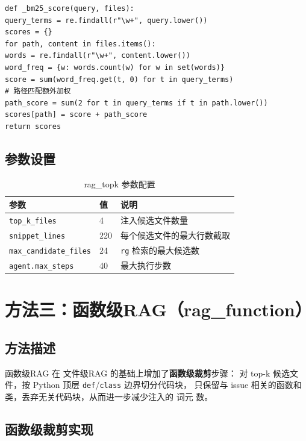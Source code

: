 \begin{lstlisting}[style=promptstyle, caption={TopKFileSelector BM25 打分（节选自 src/compression/context\_compressor.py）}, label={lst:bm25}]
def _bm25_score(query, files):
query_terms = re.findall(r"\w+", query.lower())
scores = {}
for path, content in files.items():
words = re.findall(r"\w+", content.lower())
word_freq = {w: words.count(w) for w in set(words)}
score = sum(word_freq.get(t, 0) for t in query_terms)
# 路径匹配额外加权
path_score = sum(2 for t in query_terms if t in path.lower())
scores[path] = score + path_score
return scores
\end{lstlisting}

\subsection{参数设置}

\begin{table}[htbp]
\centering
\caption{rag\_topk 参数配置}
\label{tab:ragtopk-params}
\begin{tabular}{lll}
\toprule
参数 & 值 & 说明 \\
\midrule
\texttt{top\_k\_files} & 4 & 注入候选文件数量 \\
\texttt{snippet\_lines} & 220 & 每个候选文件的最大行数截取 \\
\texttt{max\_candidate\_files} & 24 & \texttt{rg} 检索的最大候选数 \\
\texttt{agent.max\_steps} & 40 & 最大执行步数 \\
\bottomrule
\end{tabular}
\end{table}


\section{方法三：函数级RAG（rag\_function）}
\label{sec:rag-function}

\subsection{方法描述}

函数级RAG 在 文件级RAG 的基础上增加了\textbf{函数级裁剪}步骤：
对 top-k 候选文件，按 Python 顶层 \texttt{def}/\texttt{class} 边界切分代码块，
只保留与 issue 相关的函数和类，丢弃无关代码块，从而进一步减少注入的 词元 数。

\subsection{函数级裁剪实现}

